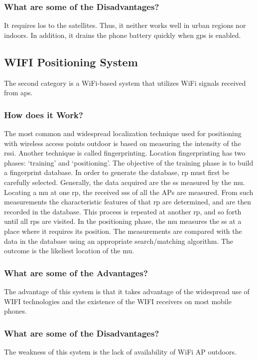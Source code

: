 \subsubsection{What are some of the Disadvantages?}
It requires \ac{los} to the satellites.
Thus, it neither works well in urban regions nor indoors.
In addition, it drains the phone battery quickly when \ac{gps} is enabled.\cite{8886005}

\subsection{WIFI Positioning System}
The second category is a WiFi-based system that utilizes WiFi signals received from \ac{aps}.

\subsubsection{How does it Work?}
The most common and widespread localization technique used for positioning with wireless access points  outdoor is based on measuring the intensity of the \ac{rssi}.
Another technique is called fingerprinting.
Location fingerprinting has two phases: `training' and `positioning'.
The objective of the training phase is to build a fingerprint database.
In order to generate the database, \ac{rp} must first be carefully selected.
Generally, the data acquired are the \ac{ss} measured by the \ac{mu}.
Locating a \ac{mu} at one \ac{rp}, the received \ac{ss}s of all the APs are measured.
From such measurements the characteristic features of that \ac{rp} are determined, and are then recorded in the database.
This process is repeated at another \ac{rp}, and so forth until all \ac{rp}s are visited.
In the positioning phase, the \ac{mu} measures the \ac{ss} at a place where it requires its position.
The measurements are compared with the data in the database using an appropriate search/matching algorithm.
The outcome is the likeliest location of the \ac{mu}.\cite{wifi}

\subsubsection{What are some of the Advantages?}
The advantage of this system is that it takes advantage of the widespread use of WIFI technologies and the existence of the WIFI receivers on most mobile phones.

\subsubsection{What are some of the Disadvantages?}
The weakness of this system is the lack of availability of WiFi AP outdoors.

